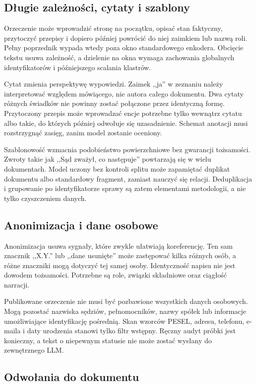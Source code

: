 \subsection{Długie zależności, cytaty i szablony}

Orzeczenie może wprowadzić stronę na początku, opisać stan faktyczny, przytoczyć przepisy i dopiero później powrócić do niej zaimkiem lub nazwą roli. Pełny poprzednik wypada wtedy poza okno standardowego enkodera. Obcięcie tekstu usuwa zależność, a dzielenie na okna wymaga zachowania globalnych identyfikatorów i późniejszego scalania klastrów.

Cytat zmienia perspektywę wypowiedzi. Zaimek ,,ja'' w zeznaniu należy interpretować względem mówiącego, nie autora całego dokumentu. Dwa cytaty różnych świadków nie powinny zostać połączone przez identyczną formę. Przytoczony przepis może wprowadzać encje potrzebne tylko wewnątrz cytatu albo takie, do których później odwołuje się uzasadnienie. Schemat anotacji musi rozstrzygnąć zasięg, zanim model zostanie oceniony.

Szablonowość wzmacnia podobieństwo powierzchniowe bez gwarancji tożsamości. Zwroty takie jak ,,Sąd zważył, co następuje'' powtarzają się w wielu dokumentach. Model uczony bez kontroli splitu może zapamiętać duplikat dokumentu albo standardowy fragment, zamiast nauczyć się relacji. Deduplikacja i grupowanie po identyfikatorze sprawy są zatem elementami metodologii, a nie tylko czyszczeniem danych.

\subsection{Anonimizacja i dane osobowe}

Anonimizacja usuwa sygnały, które zwykle ułatwiają koreferencję. Ten sam znacznik ,,X.Y.'' lub ,,dane usunięte'' może zastępować kilka różnych osób, a różne znaczniki mogą dotyczyć tej samej osoby. Identyczność napisu nie jest dowodem tożsamości. Potrzebne są role, związki składniowe oraz ciągłość narracji.

Publikowane orzeczenie nie musi być pozbawione wszystkich danych osobowych. Mogą pozostać nazwiska sędziów, pełnomocników, nazwy spółek lub informacje umożliwiające identyfikację pośrednią. Skan wzorców PESEL, adresu, telefonu, e-maila i daty urodzenia stanowi tylko filtr wstępny. Ręczny audyt próbki jest konieczny, a tekst o niepewnym statusie nie może zostać wysłany do zewnętrznego LLM.

\subsection{Odwołania do dokumentu}

